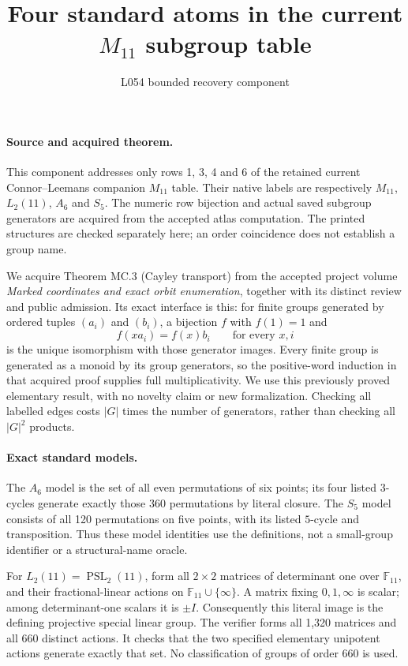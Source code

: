\documentclass[11pt]{article}
\title{Four standard atoms in the current $M_{11}$ subgroup table}
\author{L054 bounded recovery component}\date{}
\begin{document}
\maketitle
\paragraph{Source and acquired theorem.}
This component addresses only rows 1, 3, 4 and 6 of the retained current
Connor--Leemans companion $M_{11}$ table. Their native labels are respectively
$M_{11}$, $L_2(11)$, $A_6$ and $S_5$. The numeric row bijection and actual
saved subgroup generators are acquired from the accepted atlas computation.
The printed structures are checked separately here; an order coincidence
does not establish a group name.

We acquire Theorem MC.3 (Cayley transport) from the accepted project volume
\emph{Marked coordinates and exact orbit enumeration}, together with its
distinct review and public admission. Its exact interface is this: for
finite groups generated by ordered tuples $(a_i)$ and $(b_i)$, a bijection
$f$ with $f(1)=1$ and
\[
 f(xa_i)=f(x)b_i\qquad\text{for every }x,i
\]
is the unique isomorphism with those generator images. Every finite group
is generated as a monoid by its group generators, so the positive-word
induction in that acquired proof supplies full multiplicativity. We use
this previously proved elementary result, with no novelty claim or new
formalization. Checking all labelled edges costs $|G|$ times the number of
generators, rather than checking all $|G|^2$ products.

\paragraph{Exact standard models.}
The $A_6$ model is the set of all even permutations of six points; its four
listed $3$-cycles generate exactly those 360 permutations by literal
closure. The $S_5$ model consists of all 120 permutations on five points,
with its listed $5$-cycle and transposition. Thus these model identities use
the definitions, not a small-group identifier or a structural-name oracle.

For $L_2(11)=\operatorname{PSL}_2(11)$, form all $2\times2$ matrices of
determinant one over $\mathbb F_{11}$, and their fractional-linear actions
on $\mathbb F_{11}\cup\{\infty\}$. A matrix fixing $0,1,\infty$ is scalar;
among determinant-one scalars it is $\pm I$. Consequently this literal
image is the defining projective special linear group. The verifier forms
all 1,320 matrices and all 660 distinct actions. It checks that the two
specified elementary unipotent actions generate exactly that set. No
classification of groups of order 660 is used.
\end{document}
